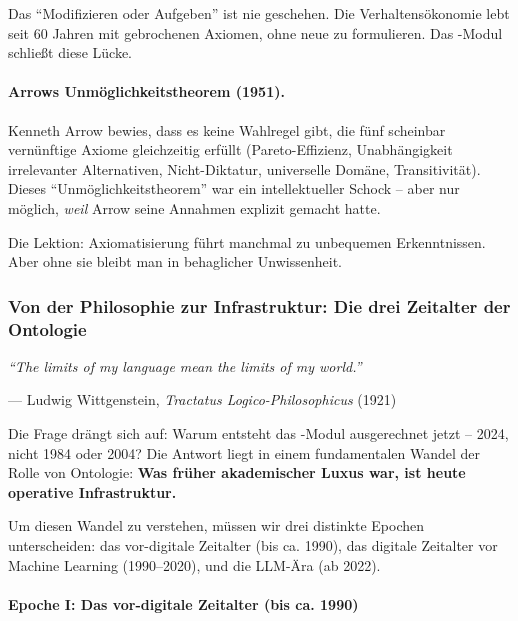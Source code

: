 Das ``Modifizieren oder Aufgeben'' ist nie geschehen. Die Verhaltensökonomie lebt seit 60 Jahren mit gebrochenen Axiomen, ohne neue zu formulieren. Das \META-Modul schließt diese Lücke.

\paragraph{Arrows Unmöglichkeitstheorem (1951).}

Kenneth Arrow bewies, dass es keine Wahlregel gibt, die fünf scheinbar vernünftige Axiome gleichzeitig erfüllt (Pareto-Effizienz, Unabhängigkeit irrelevanter Alternativen, Nicht-Diktatur, universelle Domäne, Transitivität). Dieses ``Unmöglichkeitstheorem'' war ein intellektueller Schock -- aber nur möglich, \textit{weil} Arrow seine Annahmen explizit gemacht hatte.

Die Lektion: Axiomatisierung führt manchmal zu unbequemen Erkenntnissen. Aber ohne sie bleibt man in behaglicher Unwissenheit.

\subsubsection{Von der Philosophie zur Infrastruktur: Die drei Zeitalter der Ontologie}

\epigraph{\textit{``The limits of my language mean the limits of my world.''}}{--- Ludwig Wittgenstein, \textit{Tractatus Logico-Philosophicus} (1921)}

Die Frage drängt sich auf: Warum entsteht das \META-Modul ausgerechnet jetzt -- 2024, nicht 1984 oder 2004? Die Antwort liegt in einem fundamentalen Wandel der Rolle von Ontologie: \textbf{Was früher akademischer Luxus war, ist heute operative Infrastruktur.}

Um diesen Wandel zu verstehen, müssen wir drei distinkte Epochen unterscheiden: das vor-digitale Zeitalter (bis ca. 1990), das digitale Zeitalter vor Machine Learning (1990--2020), und die LLM-Ära (ab 2022).

\paragraph{Epoche I: Das vor-digitale Zeitalter (bis ca. 1990)}

